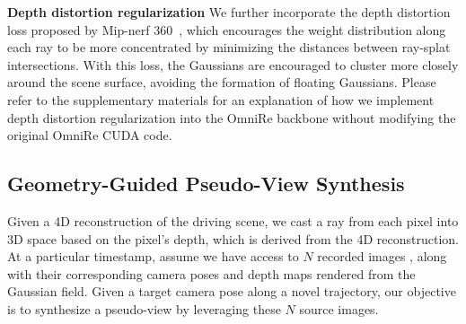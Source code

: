 \noindent \textbf{Depth distortion regularization} 
We further incorporate the depth distortion loss proposed by Mip-nerf 360~\cite{barron2022mip}, which encourages the weight distribution along each ray to be more concentrated by minimizing the distances between ray-splat intersections. With this loss, the Gaussians are encouraged to cluster more closely around the scene surface, avoiding the formation of floating Gaussians.
Please refer to the supplementary materials for an explanation of how we implement depth distortion regularization into the OmniRe backbone without modifying the original OmniRe CUDA code.






\subsection{Geometry-Guided Pseudo-View Synthesis} \label{sec:Pseudo}
Given a 4D reconstruction of the driving scene, we cast a ray from each pixel into 3D space based on the pixel's depth, which is derived from the 4D reconstruction. 
At a particular timestamp, assume we have access to $N$ recorded images 
, along with their corresponding camera poses and depth maps rendered from the Gaussian field. Given a target camera pose along a novel trajectory, our objective is to synthesize a pseudo-view by leveraging these $N$ source images.

